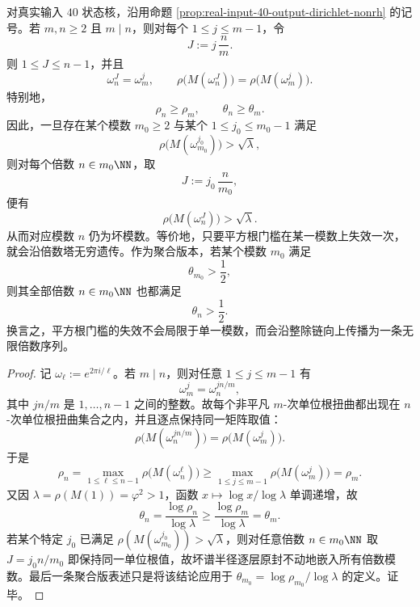 \begin{conclusion}\label{con:xi-time-part9l-dirichlet-twist-divisibility-monotonicity}
对真实输入 \(40\) 状态核，沿用命题 \ref{prop:real-input-40-output-dirichlet-nonrh} 的记号。若 \(m,n\ge 2\) 且 \(m\mid n\)，则对每个 \(1\le j\le m-1\)，令
\[
J:=j\,\frac{n}{m}.
\]
则 \(1\le J\le n-1\)，并且
\[
\omega_n^{J}=\omega_m^j,
\qquad
\rho\!\bigl(M(\omega_n^J)\bigr)=\rho\!\bigl(M(\omega_m^j)\bigr).
\]
特别地，
\[
\rho_n\ge \rho_m,
\qquad
\theta_n\ge \theta_m.
\]
因此，一旦存在某个模数 \(m_0\ge 2\) 与某个 \(1\le j_0\le m_0-1\) 满足
\[
\rho\!\bigl(M(\omega_{m_0}^{j_0})\bigr)>\sqrt{\lambda},
\]
则对每个倍数 \(n\in m_0\NN\)，取
\[
J:=j_0\,\frac{n}{m_0},
\]
便有
\[
\rho\!\bigl(M(\omega_n^J)\bigr)>\sqrt{\lambda}.
\]
从而对应模数 \(n\) 仍为坏模数。等价地，只要平方根门槛在某一模数上失效一次，就会沿倍数塔无穷遗传。作为聚合版本，若某个模数 \(m_0\) 满足
\[
\theta_{m_0}>\frac12,
\]
则其全部倍数 \(n\in m_0\NN\) 也都满足
\[
\theta_n>\frac12.
\]
换言之，平方根门槛的失效不会局限于单一模数，而会沿整除链向上传播为一条无限倍数序列。
\end{conclusion}
\begin{proof}
记 \(\omega_\ell:=e^{2\pi i/\ell}\)。若 \(m\mid n\)，则对任意 \(1\le j\le m-1\) 有
\[
\omega_m^j=\omega_n^{jn/m},
\]
其中 \(jn/m\) 是 \(1,\dots,n-1\) 之间的整数。故每个非平凡 \(m\)-次单位根扭曲都出现在 \(n\)-次单位根扭曲集合之内，并且逐点保持同一矩阵取值：
\[
\rho\!\bigl(M(\omega_n^{jn/m})\bigr)=\rho\!\bigl(M(\omega_m^j)\bigr).
\]
于是
\[
\rho_n
=
\max_{1\le \ell\le n-1}\rho\!\bigl(M(\omega_n^\ell)\bigr)
\ge
\max_{1\le j\le m-1}\rho\!\bigl(M(\omega_m^j)\bigr)
=
\rho_m.
\]
又因 \(\lambda=\rho(M(1))=\varphi^2>1\)，函数 \(x\mapsto \log x/\log\lambda\) 单调递增，故
\[
\theta_n=\frac{\log\rho_n}{\log\lambda}\ge \frac{\log\rho_m}{\log\lambda}=\theta_m.
\]
若某个特定 \(j_0\) 已满足 \(\rho(M(\omega_{m_0}^{j_0}))>\sqrt{\lambda}\)，则对任意倍数 \(n\in m_0\NN\) 取 \(J=j_0n/m_0\) 即保持同一单位根值，故坏谱半径逐层原封不动地嵌入所有倍数模数。最后一条聚合版表述只是将该结论应用于 \(\theta_{m_0}=\log\rho_{m_0}/\log\lambda\) 的定义。证毕。
\end{proof}


